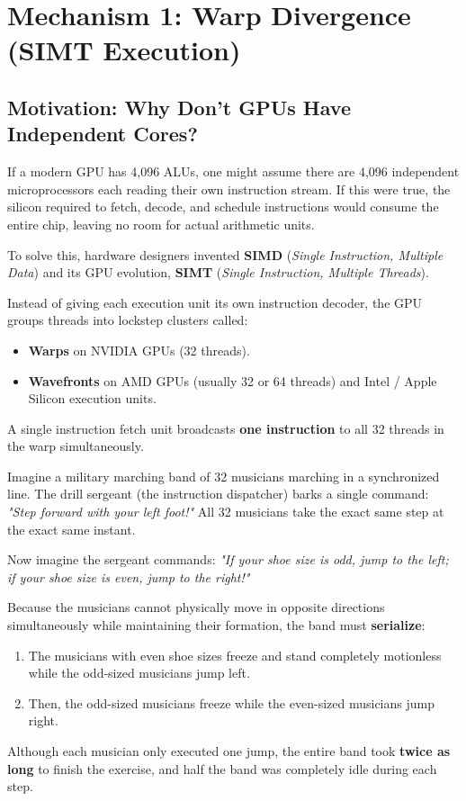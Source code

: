 \documentclass[a4paper,11pt]{article}
\begin{document}
\section{Mechanism 1: Warp Divergence (SIMT Execution)}

\subsection{Motivation: Why Don't GPUs Have Independent Cores?}

If a modern GPU has 4,096 ALUs, one might assume there are 4,096 independent microprocessors each reading their own instruction stream. If this were true, the silicon required to fetch, decode, and schedule instructions would consume the entire chip, leaving no room for actual arithmetic units.

To solve this, hardware designers invented \textbf{SIMD} (\textit{Single Instruction, Multiple Data}) and its GPU evolution, \textbf{SIMT} (\textit{Single Instruction, Multiple Threads}). 

Instead of giving each execution unit its own instruction decoder, the GPU groups threads into lockstep clusters called:
\begin{itemize}
  \item \textbf{Warps} on NVIDIA GPUs (32 threads).
  \item \textbf{Wavefronts} on AMD GPUs (usually 32 or 64 threads) and Intel / Apple Silicon execution units.
\end{itemize}

A single instruction fetch unit broadcasts \textbf{one instruction} to all 32 threads in the warp simultaneously.

\begin{analogybox}
Imagine a military marching band of 32 musicians marching in a synchronized line. The drill sergeant (the instruction dispatcher) barks a single command: \textit{"Step forward with your left foot!"} All 32 musicians take the exact same step at the exact same instant. 

Now imagine the sergeant commands: \textit{"If your shoe size is odd, jump to the left; if your shoe size is even, jump to the right!"}

Because the musicians cannot physically move in opposite directions simultaneously while maintaining their formation, the band must \textbf{serialize}:
\begin{enumerate}
  \item The musicians with even shoe sizes freeze and stand completely motionless while the odd-sized musicians jump left.
  \item Then, the odd-sized musicians freeze while the even-sized musicians jump right.
\end{enumerate}
Although each musician only executed one jump, the entire band took \textbf{twice as long} to finish the exercise, and half the band was completely idle during each step.
\end{analogybox}
\end{document}
